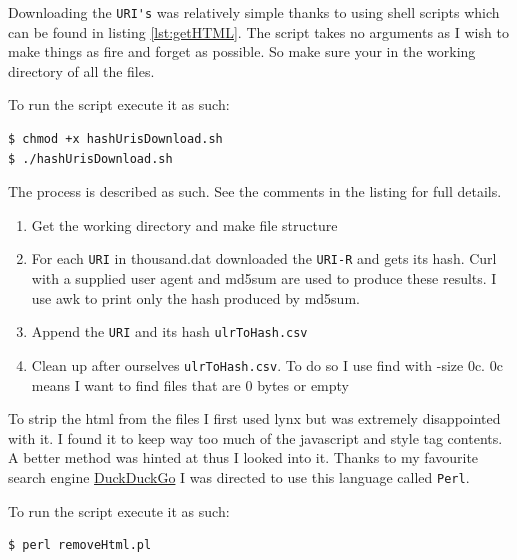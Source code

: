 \documentclass[letterpaper,10pt]{article}
\begin{document}
Downloading the \verb+URI's+ was relatively simple thanks to using shell scripts which can be
found in listing \ref{lst:getHTML}. The script takes no arguments as I wish to make things as fire and forget as possible. So make sure your in the working directory of all the files.  

To run the script execute it as such:
\begin{lstlisting}[frame=single]
$ chmod +x hashUrisDownload.sh
$ ./hashUrisDownload.sh
\end{lstlisting}


The process is described as such. See the comments in the listing for full details.
\begin{enumerate}
\item Get the working directory and make file structure
\item For each \verb+URI+ in thousand.dat downloaded the \verb+URI-R+ and gets its hash. Curl with a supplied user agent and md5sum are used to produce these results. I use awk to print only the hash produced by md5sum.  
\item Append the \verb+URI+ and its hash \verb+ulrToHash.csv+
\item Clean up after ourselves \verb+ulrToHash.csv+. To do so I use find with -size 0c. 0c means I want to find files that are 0 bytes or empty 
\end{enumerate}

To strip the html from the files I first used lynx but was extremely disappointed with it.
I found it to keep way too much of the javascript and style tag contents. A better method was hinted at thus I looked into it. Thanks to my favourite search engine \href{www.duckduckgo.com}{DuckDuckGo} I was directed to use this language called \verb+Perl+.

To run the script execute it as such:
\begin{lstlisting}[frame=single]
$ perl removeHtml.pl
\end{lstlisting}
\end{document}
